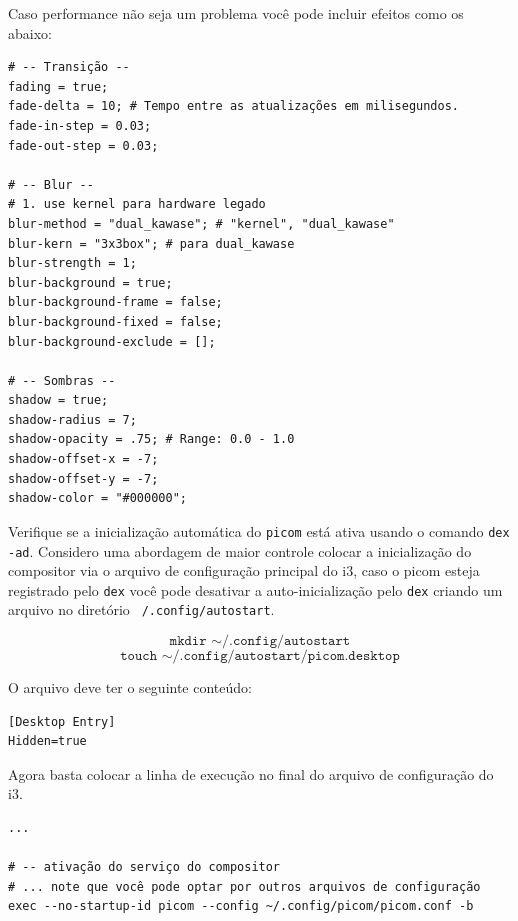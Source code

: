 \documentclass[12pt,a4paper]{article}
\begin{document}
\vspace{\baselineskip}

Caso performance não seja um problema você pode incluir efeitos como os abaixo: \\

\begin{lstlisting}
# -- Transição --
fading = true;
fade-delta = 10; # Tempo entre as atualizações em milisegundos.
fade-in-step = 0.03;
fade-out-step = 0.03;

# -- Blur -- 
# 1. use kernel para hardware legado
blur-method = "dual_kawase"; # "kernel", "dual_kawase"
blur-kern = "3x3box"; # para dual_kawase
blur-strength = 1;
blur-background = true;
blur-background-frame = false;
blur-background-fixed = false;
blur-background-exclude = [];

# -- Sombras -- 
shadow = true;
shadow-radius = 7;
shadow-opacity = .75; # Range: 0.0 - 1.0
shadow-offset-x = -7;
shadow-offset-y = -7;
shadow-color = "#000000";
\end{lstlisting}

\vspace{\baselineskip}

Verifique se a inicialização automática do \texttt{picom} está ativa usando o comando \texttt{dex -ad}. Considero uma abordagem de maior controle colocar a inicialização do compositor via o arquivo de configuração principal do i3, caso o picom esteja registrado pelo \texttt{dex} você pode desativar a auto-inicialização pelo \texttt{dex} criando um arquivo no diretório \texttt{~/.config/autostart}.

$$ \texttt{mkdir $\sim$/.config/autostart} $$
$$ \texttt{touch $\sim$/.config/autostart/picom.desktop} $$

O arquivo deve ter o seguinte conteúdo:\\

\begin{lstlisting}
[Desktop Entry]
Hidden=true
\end{lstlisting}

\vspace{\baselineskip}

Agora basta colocar a linha de execução no final do arquivo de configuração do i3.\\

\begin{lstlisting}
... 

# -- ativação do serviço do compositor
# ... note que você pode optar por outros arquivos de configuração
exec --no-startup-id picom --config ~/.config/picom/picom.conf -b
\end{lstlisting}
\end{document}
